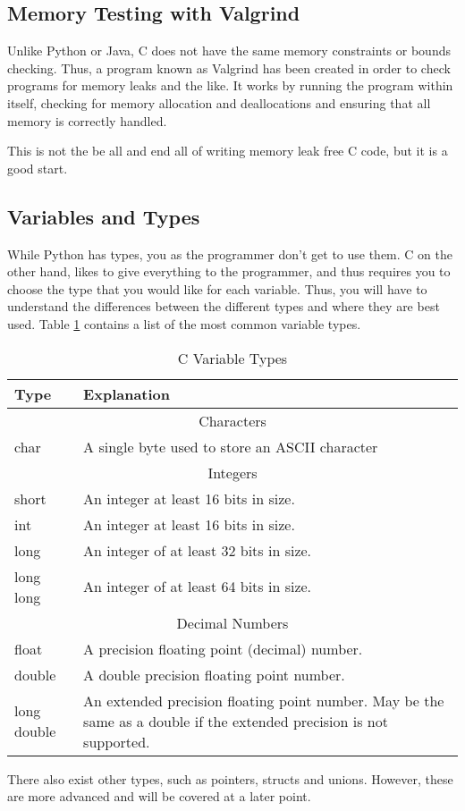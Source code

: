 		\subsection{Memory Testing with Valgrind}
			Unlike Python or Java, C does not have the same memory constraints or bounds checking.
			Thus, a program known as Valgrind has been created in order to check programs for memory leaks and the like.
			It works by running the program within itself, checking for memory allocation and deallocations and ensuring that all memory is correctly handled.

			This is not the be all and end all of writing memory leak free C code, but it is a good start.
		\subsection{Variables and Types}
			While Python has types, you as the programmer don't get to use them.
			C on the other hand, likes to give everything to the programmer, and thus requires you to choose the type that you would like for each variable.
			Thus, you will have to understand the differences between the different types and where they are best used.
			Table \ref{tab:CVariableTypes} contains a list of the most common variable types.
			\begin{table}[htb]
				\centering
				\begin{adjustbox}{max width=1\textwidth}
				\begin{tabular}{ l  p{8cm} }
					\toprule
					\textbf{Type} & \textbf{Explanation} \\
					\toprule
					\multicolumn{2}{c}{Characters} \\
					\midrule
					char & A single byte used to store an ASCII character \\
					\midrule
					\multicolumn{2}{c}{Integers} \\
					\midrule
					short & An integer at least 16 bits in size. \\
					int & An integer at least 16 bits in size. \\
					long & An integer of at least 32 bits in size. \\
					long long & An integer of at least 64 bits in size. \\
					\midrule
					\multicolumn{2}{c}{Decimal Numbers} \\
					\midrule
					float & A precision floating point (decimal) number. \\
					double & A double precision floating point number. \\
					long double & An extended precision floating point number.
					May be the same as a double if the extended precision is not supported. \\
					\bottomrule
				\end{tabular}
				\end{adjustbox}
				\caption{C Variable Types}
				\label{tab:CVariableTypes}
			\end{table}
			There also exist other types, such as pointers, structs and unions.
			However, these are more advanced and will be covered at a later point.

